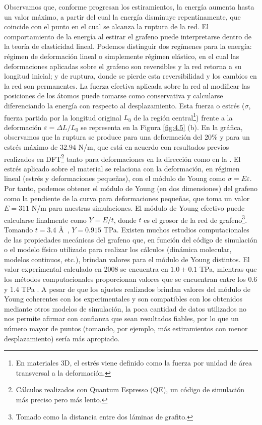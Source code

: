 Observamos que, conforme progresan los estiramientos, la energía aumenta hasta un valor máximo, a partir del cual la energía disminuye repentinamente, que coincide con el punto en el cual se alcanza la ruptura de la red. El comportamiento de la energía al estirar el grafeno puede interpretarse dentro de la teoría de elasticidad lineal. Podemos distinguir dos regímenes para la energía: régimen de deformación lineal o simplemente régimen elástico, en el cual las deformaciones aplicadas sobre el grafeno son reversibles y la red retorna a su longitud inicial; y de ruptura, donde se pierde esta reversibilidad y los cambios en la red son permanentes. La fuerza efectiva aplicada sobre la red al modificar las posiciones de los átomos puede tomarse como conservativa y calcularse diferenciando la energía con respecto al desplazamiento. Esta fuerza o estrés ($\sigma$, fuerza partida por la longitud original $L_0$ de la región central\footnote{En materiales 3D, el estrés viene definido como la fuerza por unidad de área transversal a la deformación.}) frente a la deformación $\varepsilon = \Delta L/L_0$ se representa en la Figura \ref{fig:4.5} (b). En la gráfica, observamos que la ruptura se produce para una deformación del 20$\%$ y para un estrés máximo de $32.94$ N/m, que está en acuerdo con resultados previos realizados en DFT\footnote{Cálculos realizados con Quantum Espresso (QE), un código de simulación más preciso pero más lento.} tanto para deformaciones en la dirección \arm como en la \zig \cite{elastic}. El estrés aplicado sobre el material se relaciona con la deformación, en régimen lineal (estrés y deformaciones pequeñas), con el módulo de Young como $\sigma = E \varepsilon$. Por tanto, podemos obtener el módulo de Young (en dos dimensiones) del grafeno como la pendiente de la curva para deformaciones pequeñas, que toma un valor $E = 311$ N/m para nuestras simulaciones. El módulo de Young efectivo puede calcularse finalmente como $Y = E/t$, donde $t$ es el grosor de la red de grafeno\footnote{Tomado como la distancia entre dos láminas de grafito.}. Tomando $t = 3.4$ \AA \ , $Y = 0.915$ TPa. Existen muchos estudios computacionales de las propiedades mecánicas del grafeno que, en función del código de simulación o el modelo físico utilizado para realizar los cálculos (dinámica molecular, modelos continuos, etc.), brindan valores para el módulo de Young distintos. El valor experimental calculado en 2008 \cite{science} se encuentra en $1.0 \pm 0.1 $ TPa, mientras que los métodos computacionales proporcionan valores que se encuentran entre los 0.6 y 1.4 TPa \cite{MEMARIAN2015348}. A pesar de que los ajustes realizados brindan valores del módulo de Young coherentes con los experimentales y son compatibles con los obtenidos mediante otros modelos de simulación, la poca cantidad de datos utilizados no nos permite afirmar con confianza que sean resultados fiables, por lo que un número mayor de puntos (tomando, por ejemplo, más estiramientos con menor desplazamiento) sería más apropiado.\\

